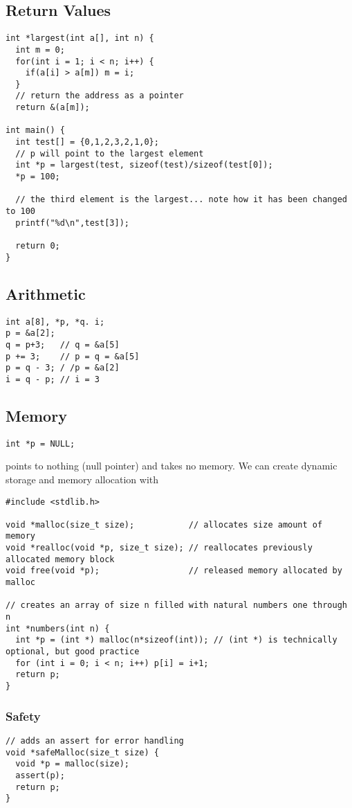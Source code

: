 \documentclass[12pt]{article}
\begin{document}
\subsection*{Return Values}
\begin{verbatim}
int *largest(int a[], int n) {
  int m = 0;
  for(int i = 1; i < n; i++) {
    if(a[i] > a[m]) m = i;
  }
  // return the address as a pointer
  return &(a[m]);

int main() {
  int test[] = {0,1,2,3,2,1,0};
  // p will point to the largest element
  int *p = largest(test, sizeof(test)/sizeof(test[0]);
  *p = 100;
  
  // the third element is the largest... note how it has been changed to 100
  printf("%d\n",test[3]);

  return 0;
}
\end{verbatim}

\subsection*{Arithmetic}
\begin{verbatim}
int a[8], *p, *q. i;
p = &a[2];
q = p+3;   // q = &a[5]
p += 3;    // p = q = &a[5]
p = q - 3; / /p = &a[2]
i = q - p; // i = 3
\end{verbatim}

\subsection*{Memory}
\begin{verbatim}int *p = NULL;\end{verbatim} points to nothing (null pointer) and takes no memory. We can create dynamic storage and memory allocation with
\begin{verbatim}
#include <stdlib.h>

void *malloc(size_t size);           // allocates size amount of memory
void *realloc(void *p, size_t size); // reallocates previously allocated memory block
void free(void *p);                  // released memory allocated by malloc

// creates an array of size n filled with natural numbers one through n
int *numbers(int n) {
  int *p = (int *) malloc(n*sizeof(int)); // (int *) is technically optional, but good practice
  for (int i = 0; i < n; i++) p[i] = i+1;
  return p;
}
\end{verbatim}

\subsubsection*{Safety}
\begin{verbatim}
// adds an assert for error handling
void *safeMalloc(size_t size) {
  void *p = malloc(size);
  assert(p);
  return p;
}
\end{verbatim}
\end{document}
